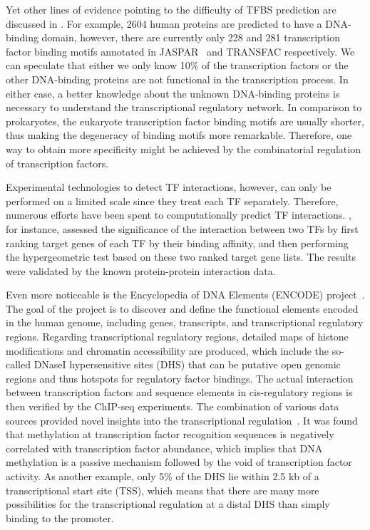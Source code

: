Yet other lines of evidence pointing to the difficulty of TFBS prediction are
discussed in \cite{Babu2004}. For example, 2604 human proteins are predicted to
have a DNA-binding domain, however, there are currently only 228 and 281 
transcription
factor binding motifs annotated in JASPAR~\citep{Sandelin2004} and TRANSFAC 
respectively. We can speculate that either we only know 10\% of the transcription
factors or the other DNA-binding proteins are not functional in the transcription
process. In either case, a better knowledge about the unknown DNA-binding
proteins is necessary to understand the transcriptional regulatory network.
In comparison to prokaryotes, the eukaryote transcription factor binding motifs 
are usually shorter, thus making the degeneracy of binding motifs more remarkable.
Therefore, one way to obtain more specificity might be achieved by the 
combinatorial regulation of transcription factors.

Experimental technologies to detect TF interactions, however,
can only be performed on a limited scale since they treat 
each TF separately. Therefore, numerous efforts have been
spent to computationally predict TF interactions. 
\cite{Mysickova2012}, for instance, assessed the significance
of the interaction between two TFs by first ranking target
genes of each TF by their binding affinity, and then 
performing the hypergeometric 
test based on these two ranked target gene lists.
The results were validated by the known protein-protein
interaction data.

Even more noticeable is the Encyclopedia of DNA Elements 
(ENCODE) project~\citep{ENCODE2011}. The goal of the project
is to discover and define the functional elements encoded 
in the human genome, including genes, transcripts, and 
transcriptional regulatory regions. Regarding transcriptional
regulatory regions, detailed maps of histone modifications
and chromatin accessibility are produced, which include
the so-called DNaseI hypersensitive sites (DHS) 
that can be putative
open genomic regions and thus hotspots for regulatory factor
bindings. The actual interaction between transcription
factors and sequence elements in cis-regulatory regions
is then verified by the ChIP-seq experiments. The combination
of various data sources provided novel insights into the
transcriptional regulation~\citep{Thurman2012b}. 
It was found that methylation at transcription factor
recognition sequences is negatively correlated with 
transcription factor abundance, which implies that DNA
methylation is a passive mechanism followed by the void of
transcription factor activity.
As another example, only 5\% of the DHS lie within 2.5 kb of a
transcriptional start site (TSS), which means that there are 
many more possibilities for the transcriptional regulation 
at a distal DHS than simply binding to the promoter.

